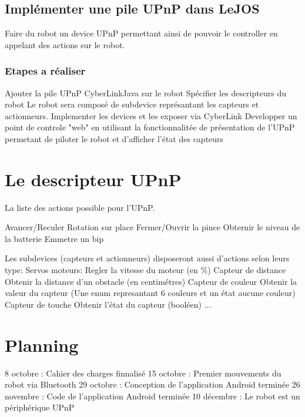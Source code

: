 \documentclass{article}
\begin{document}
		\subsection{Impl\'ementer une pile UPnP dans LeJOS}
			Faire du robot un device UPnP permettant ainsi de pouvoir le controller en appelant des actions sur le robot.
			\subsubsection{Etapes a r\'ealiser}
				Ajouter la pile UPnP CyberLinkJava sur le robot
				Sp\'ecifier les descripteurs du robot
					Le robot sera composé de subdevice repr\'esantant les capteurs et actionneurs.
				Implementer les devices et les exposer via CyberLink
				Developper un point de controle "web" en utilisant la fonctionnalitée de présentation de l'UPnP permetant de piloter le robot et d'afficher l'état des capteurs
	
	\section{Le descripteur UPnP}
		La liste des actions possible pour l'UPnP.
		
		Avancer/Reculer
		Rotation sur place
		Fermer/Ouvrir la pince
		Obternir le niveau de la batterie
		Emmetre un bip
		
		Les subdevices (capteurs et actionneurs) disposeront aussi d'actions selon leurs type:
			Servos moteurs:
				Regler la vitesse du moteur (en \%)
			Capteur de distance
				Obtenir la distance d'un obstacle (en centimétres)
			Capteur de couleur
				Obtenir la valeur du capteur (Une enum represantant 6 couleurs et un état aucune couleur)
			Capteur de touche
				Obtenir l'état du capteur (booléen)
			...

	\section{Planning}
		8 octobre : Cahier des charges finnalisé
		15 octobre : Premier mouvements du robot via Bluetooth
		29 octobre : Conception de l'application Android terminée
		26 novembre : Code de l'application Android terminée
		10 décembre : Le robot est un périphérique UPnP
\end{document}
